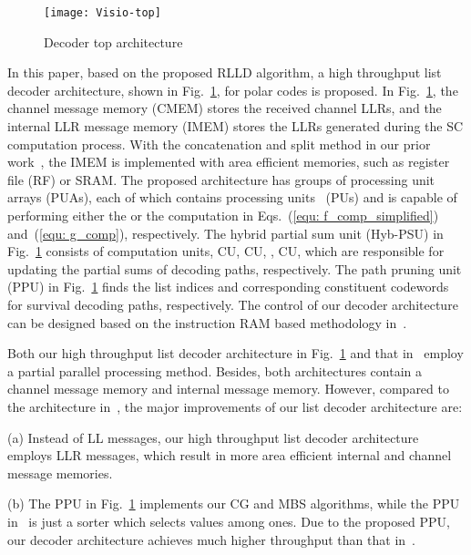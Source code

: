 \documentclass[journal]{IEEEtran}
\begin{document}
\begin{figure} [hbt]
\centering
\texttt{[image: Visio-top]}
  \caption{Decoder top architecture}\label{fig: dec_top}
\end{figure}

In this paper, based on the proposed RLLD algorithm, a high throughput list decoder architecture, shown in Fig.~\ref{fig: dec_top}, for polar codes is proposed. In Fig.~\ref{fig: dec_top}, the channel message memory (CMEM) stores the received channel LLRs, and the internal LLR message memory (IMEM) stores the LLRs generated during the SC computation process. With the concatenation and split method in our prior work~\cite{jun_low_mem_list}, the IMEM is implemented with area efficient memories, such as register file (RF) or SRAM. The proposed architecture has  groups of processing unit arrays (PUAs), each of which contains  processing units~\cite{gross_polar1} (PUs) and is capable of performing either the  or the  computation in Eqs.~(\ref{equ: f_comp_simplified}) and~(\ref{equ: g_comp}), respectively. The hybrid partial sum unit (Hyb-PSU) in Fig.~\ref{fig: dec_top} consists of  computation units, CU, CU, , CU, which are responsible for updating the partial sums of  decoding paths, respectively. The path pruning unit (PPU) in Fig.~\ref{fig: dec_top} finds the list indices and corresponding constituent codewords for  survival decoding paths, respectively. The control of our decoder architecture can be designed based on the instruction RAM based methodology in~\cite{fast_polar_SC_gross}.

Both our high throughput list decoder architecture in Fig.~\ref{fig: dec_top} and that in~\cite{jun_low_mem_list} employ a partial parallel processing method. Besides, both architectures contain a channel message memory and internal message memory. However, compared to the architecture in~\cite{jun_low_mem_list}, the major improvements of our list decoder architecture are:

(a) Instead of LL messages, our high throughput list decoder architecture employs LLR messages, which result in more area efficient internal and channel message memories.

(b) The PPU in Fig.~\ref{fig: dec_top} implements our CG and MBS algorithms, while the PPU in~\cite{jun_low_mem_list} is just a sorter which selects  values among  ones. Due to the proposed PPU, our decoder architecture achieves much higher throughput than that in~\cite{jun_low_mem_list}.
\end{document}
